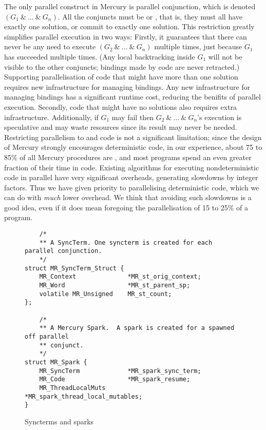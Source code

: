 The only parallel construct in Mercury is parallel conjunction,
which is denoted $(G_1~\&~\ldots~\&~G_n)$.
All the conjuncts must be \ddet or \dccmulti,
that is, they must all have exactly one solution,
or commit to exactly one solution.
This restriction greatly simplifies parallel execution in two ways:
Firstly,
it guarantees that there can never be any need
to execute $(G_2~\&~\ldots~\&~G_n)$ multiple times,
just because $G_1$ has succeeded multiple times.
(Any local backtracking inside $G_1$ will not be visible to the other
conjuncts;
bindings made by \ddet code are never retracted.)
Supporting parallelisation of
code that might have more than one solution
requires new infrastructure for managing bindings.
Any new infrastructure for managing bindings has a significant runtime cost,
reducing the benifits of parallel execution.
Secondly,
code that might have no solutions also requires extra infrastructure.
Additionally,
if $G_1$ may fail then
$G_2~\&~\ldots~\&~G_n$'s execution is speculative and may waste resources
since its result may never be needed.
Restricting parallelism to \ddet and \dccmulti code is not a significant
limitation;
since the design of Mercury strongly encourages deterministic code,
in our experience, about 75 to 85\% of all Mercury procedures are \ddet,
and most programs spend an even greater fraction of their time in \ddet code.
Existing algorithms for executing nondeterministic code in parallel
have very significant overheads, generating slowdowns by integer factors.
Thus we have given priority to parallelising deterministic code,
which we can do with \emph{much} lower overhead.
We think that avoiding such slowdowns is a good idea,
even if it does mean foregoing the parallelisation of 15 to 25\% of a program.

\begin{figure}
\begin{verbatim}
    /*
    ** A SyncTerm. One syncterm is created for each parallel conjunction.
    */
struct MR_SyncTerm_Struct {
    MR_Context              *MR_st_orig_context;
    MR_Word                 *MR_st_parent_sp;
    volatile MR_Unsigned    MR_st_count;
};

    /*
    ** A Mercury Spark.  A spark is created for a spawned off parallel
    ** conjunct.
    */
struct MR_Spark {
    MR_SyncTerm             *MR_spark_sync_term;
    MR_Code                 *MR_spark_resume;
    MR_ThreadLocalMuts      *MR_spark_thread_local_mutables;
}
\end{verbatim}
\caption{Syncterms and sparks}
\label{fig:spark_and_syncterm}
\end{figure}

